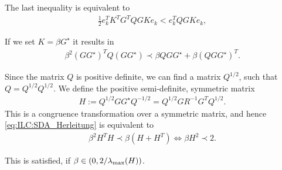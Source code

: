 The last inequality is equivalent to 
\begin{align}
\frac{1}{2}e_k^T K^T G^T Q GK e_k < e_k^T Q GK e_k, 
\end{align}

If we set $K = \beta G^{\star}$ it results in 
\begin{align}
\label{eq:ILC:SDA_Herleitung}
\beta^2 (G G^{\star})^T Q (G G^{\star}) \prec \beta Q G G^{\star} + \beta (Q G G^{\star})^T.
\end{align}

Since the matrix $Q$ is positive definite, we can find a matrix $Q^{1/2}$, such that $Q = Q^{1/2}Q^{1/2}$. We define the positive semi-definite, symmetric matrix
\begin{align}
H:= Q^{1/2} G G^{\star} Q^{-1/2} = Q^{1/2} G R^{-1}G^T Q^{1/2}. 
\end{align}
This is a congruence transformation over a symmetric matrix, and hence \eqref{eq:ILC:SDA_Herleitung} is equivalent to
\begin{align}
\beta^2 H^T H \prec \beta (H + H^T) \Leftrightarrow  \beta H^2 \prec 2.
\end{align}

This is satisfied, if $\beta \in (0, 2/\lambda_{\mathrm{max}}(H))$. 


%
%
%


